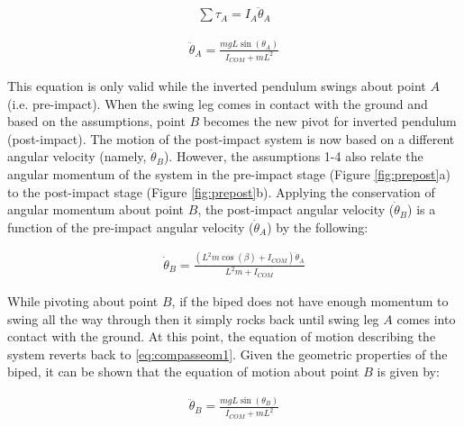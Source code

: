 \begin{equation}
	\begin{aligned}
		\sum {{\tau _A} = {I_A}} {{\ddot \theta }_A}
	\end{aligned}
\end{equation}

\begin{equation} \label{eq:compasseom1}
	\begin{aligned}
		{{\ddot \theta }_A} = \frac{{mgL\sin ({\theta _A})}}{{{I_{COM}} + m{L^2}}}
	\end{aligned}
\end{equation}

This equation is only valid while the inverted pendulum swings about point $A$ (i.e. pre-impact). When the swing leg comes in contact with the ground and based on the assumptions, point $B$ becomes the new pivot for inverted pendulum (post-impact). The motion of the post-impact system is now based on a different angular velocity (namely, $\dot{\theta}_B$). However, the assumptions 1-4 also relate the angular momentum of the system in the pre-impact stage (Figure \ref{fig:prepost}a) to the post-impact stage (Figure \ref{fig:prepost}b). Applying the conservation of angular momentum about point $B$, the post-impact angular velocity ($\dot{\theta}_B$) is a function of the pre-impact angular velocity ($\dot{\theta}_A$) \cite{Wight:2008vt} by the following: 

\begin{equation}
	\begin{aligned}
		{\dot \theta _B} = \frac{{({L^2}m\cos (\beta ) + {I_{COM}}){{\dot \theta }_A}}}{{{L^2}m + {I_{COM}}}}
	\end{aligned}
\end{equation}

While pivoting about point $B$, if the biped does not have enough momentum to swing all the way through then it simply rocks back until swing leg $A$ comes into contact with the ground. At this point, the equation of motion describing the system reverts back to \eqref{eq:compasseom1}. Given the geometric properties of the biped, it can be shown that the equation of motion about point $B$ is given by: 

\begin{equation} \label{eq:compasseom2}
	\begin{aligned}
		{\ddot \theta _B} = \frac{{mgL\sin ({\theta _B})}}{{{I_{COM}} + m{L^2}}} 
	\end{aligned}
\end{equation}

